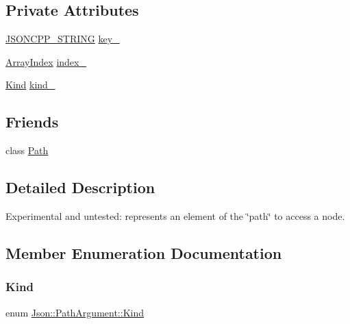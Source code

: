 \subsection*{Private Attributes}
\begin{DoxyCompactItemize}
\item 
\hyperlink{json_8h_a1e723f95759de062585bc4a8fd3fa4be_a1e723f95759de062585bc4a8fd3fa4be}{J\+S\+O\+N\+C\+P\+P\+\_\+\+S\+T\+R\+I\+NG} \hyperlink{classJson_1_1PathArgument_af4024368548ff730ef2bed97d6f1ca43_af4024368548ff730ef2bed97d6f1ca43}{key\+\_\+}
\item 
\hyperlink{namespaceJson_a8048e741f2177c3b5d9ede4a5b8c53c2_a8048e741f2177c3b5d9ede4a5b8c53c2}{Array\+Index} \hyperlink{classJson_1_1PathArgument_afd5857d1b6bfaae6961333bdae7bd5ec_afd5857d1b6bfaae6961333bdae7bd5ec}{index\+\_\+}
\item 
\hyperlink{classJson_1_1PathArgument_a2420bbad778573c147e578701b84d9b9_a2420bbad778573c147e578701b84d9b9}{Kind} \hyperlink{classJson_1_1PathArgument_ad4bc4b544b155a3d9c7788572ecf991b_ad4bc4b544b155a3d9c7788572ecf991b}{kind\+\_\+}
\end{DoxyCompactItemize}
\subsection*{Friends}
\begin{DoxyCompactItemize}
\item 
class \hyperlink{classJson_1_1PathArgument_a4877239a6b7f09fbf5a61ca68a49d74c_a4877239a6b7f09fbf5a61ca68a49d74c}{Path}
\end{DoxyCompactItemize}


\subsection{Detailed Description}
Experimental and untested\+: represents an element of the \char`\"{}path\char`\"{} to access a node. 

\subsection{Member Enumeration Documentation}
\mbox{\label{classJson_1_1PathArgument_a2420bbad778573c147e578701b84d9b9_a2420bbad778573c147e578701b84d9b9}} 
\subsubsection{\texorpdfstring{Kind}{Kind}}
{\footnotesize\ttfamily enum \hyperlink{classJson_1_1PathArgument_a2420bbad778573c147e578701b84d9b9_a2420bbad778573c147e578701b84d9b9}{Json\+::\+Path\+Argument\+::\+Kind}\hspace{0.3cm}{\ttfamily [private]}}

